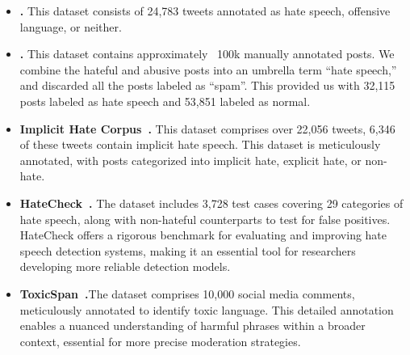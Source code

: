 

\begin{itemize}
    \item \textbf{\citeauthor{davidson2017automated}\cite{davidson2017automated}.} This dataset consists of 24,783 tweets annotated as hate speech, offensive language, or neither. 

    \item \textbf{\citeauthor{founta2018large}\cite{founta2018large}.} This dataset contains approximately ~100k manually annotated posts. We combine the hateful and abusive posts into an umbrella term ``hate speech,'' and discarded all the posts labeled as ``spam''. This provided us with 32,115 posts labeled as hate speech and 53,851 labeled as normal.

    \item \textbf{Implicit Hate Corpus~\cite{elsherief-etal-2021-latent}.} This dataset comprises over 22,056 tweets, 6,346 of these tweets contain implicit hate speech. This dataset is meticulously annotated, with posts categorized into implicit hate, explicit hate, or non-hate.

    \item \textbf{HateCheck~\cite{rottger-etal-2021-hatecheck}.} The dataset includes 3,728 test cases covering 29 categories of hate speech, along with non-hateful counterparts to test for false positives. HateCheck offers a rigorous benchmark for evaluating and improving hate speech detection systems, making it an essential tool for researchers developing more reliable detection models.

    \item \textbf{ToxicSpan~\cite{pavlopoulos-etal-2022-acl}.}The dataset comprises 10,000 social media comments, meticulously annotated to identify toxic language. This detailed annotation enables a nuanced understanding of harmful phrases within a broader context, essential for more precise moderation strategies.


\end{itemize}
